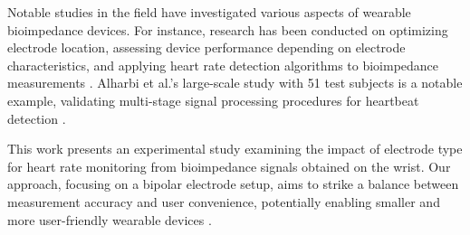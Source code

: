 {Notable studies in the field have investigated various aspects of wearable bioimpedance devices. For instance, research has been conducted on optimizing electrode location, assessing device performance depending on electrode characteristics, and applying heart rate detection algorithms to bioimpedance measurements \cite{ormanis2020towards, lee2021recent, zhang2023physiological}. Alharbi et al.'s large-scale study with 51 test subjects is a notable example, validating multi-stage signal processing procedures for heartbeat detection \cite{ormanis2020towards, bellier2023wireless}.

This work presents an experimental study examining the impact of electrode type for heart rate monitoring from bioimpedance signals obtained on the wrist. Our approach, focusing on a bipolar electrode setup, aims to strike a balance between measurement accuracy and user convenience, potentially enabling smaller and more user-friendly wearable devices \cite{ormanis2020towards}.
}


